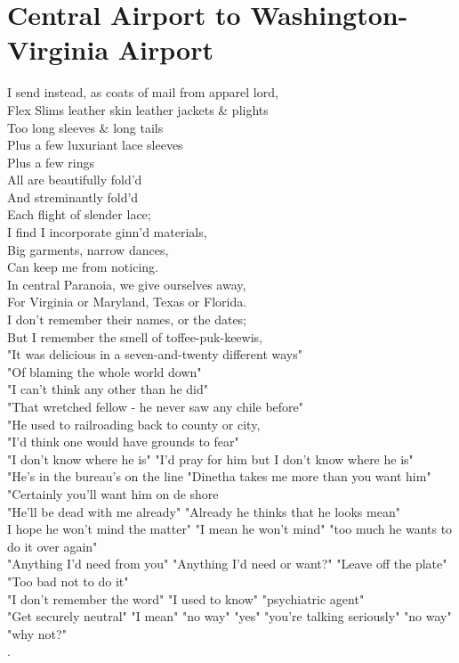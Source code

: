 \documentclass[smalldemyvopaper,11pt,twoside,onecolumn,openright,extrafontsizes]{memoir}
\begin{document}
\chapter{Central Airport to Washington-Virginia Airport}
I send instead, as coats of mail from apparel lord,
\\Flex Slims leather skin leather jackets \& plights
\\Too long sleeves \& long tails
\\Plus a few luxuriant lace sleeves
\\Plus a few rings
\\All are beautifully fold'd
\\And streminantly fold'd
\\Each flight of slender lace;
\\I find I incorporate ginn'd materials,
\\Big garments, narrow dances,
\\Can keep me from noticing.
\\In central Paranoia, we give ourselves away,
\\For Virginia or Maryland, Texas or Florida.
\\I don't remember their names, or the dates;
\\But I remember the smell of toffee-puk-keewis,
\\"It was delicious in a seven-and-twenty different ways"
\\"Of blaming the whole world down"
\\"I can't think any other than he did"
\\"That wretched fellow - he never saw any chile before"
\\"He used to railroading back to county or city,
\\"I'd think one would have grounds to fear"
\\"I don't know where he is" "I'd pray for him but I don't know where he is"
\\"He's in the bureau's on the line "Dinetha takes me more than you want him"
\\"Certainly you'll want him on de shore
\\"He'll be dead with me already" "Already he thinks that he looks mean"
\\I hope he won't mind the matter" "I mean he won't mind" "too much he wants to do it over again"
\\"Anything I'd need from you" "Anything I'd need or want?" "Leave off the plate" "Too bad not to do it"
\\"I don't remember the word" "I used to know" "psychiatric agent"
\\"Get securely neutral" "I mean" "no way" "yes" "you're talking seriously" "no way" "why not?"
\\.
\end{document}
